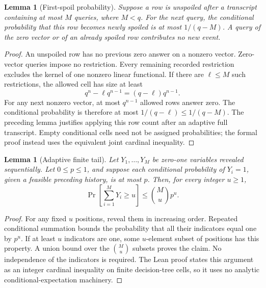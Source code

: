 \documentclass[11pt,letterpaper]{article}
\newtheorem{lemma}[theorem]{Lemma}
\theoremstyle{definition}
\newcommand{\Prb}{\mathop{\mathrm{Pr}}}
\begin{document}
\begin{lemma}[First-spoil probability]
Suppose a row is unspoiled after a transcript containing at most $M$ queries, where $M<q$. For the next query, the conditional probability that this row becomes newly spoiled is at most $1/(q-M)$. A query of the zero vector or of an already spoiled row contributes no new event.
\label{lem:conditional}
\end{lemma}
\begin{proof}
An unspoiled row has no previous zero answer on a nonzero vector. Zero-vector queries impose no restriction. Every remaining recorded restriction excludes the kernel of one nonzero linear functional. If there are $\ell\le M$ such restrictions, the allowed cell has size at least
\[
 q^n-\ell q^{n-1}=(q-\ell)q^{n-1}.
\]
For any next nonzero vector, at most $q^{n-1}$ allowed rows answer zero. The conditional probability is therefore at most $1/(q-\ell)\le1/(q-M)$. The preceding lemma justifies applying this row count after an adaptive full transcript. Empty conditional cells need not be assigned probabilities; the formal proof instead uses the equivalent joint cardinal inequality.
\end{proof}

\begin{lemma}[Adaptive finite tail]
Let $Y_1,\ldots,Y_M$ be zero-one variables revealed sequentially. Let $0\le p\le1$, and suppose each conditional probability of $Y_i=1$, given a feasible preceding history, is at most $p$. Then, for every integer $u\ge1$,
\[
 \Prb\!\left[\sum_{i=1}^{M}Y_i\ge u\right]\le\binom{M}{u}p^u.
\]
\label{lem:tail}
\end{lemma}
\begin{proof}
For any fixed $u$ positions, reveal them in increasing order. Repeated conditional summation bounds the probability that all their indicators equal one by $p^u$. If at least $u$ indicators are one, some $u$-element subset of positions has this property. A union bound over the $\binom{M}{u}$ subsets proves the claim. No independence of the indicators is required. The Lean proof states this argument as an integer cardinal inequality on finite decision-tree cells, so it uses no analytic conditional-expectation machinery.
\end{proof}
\end{document}
